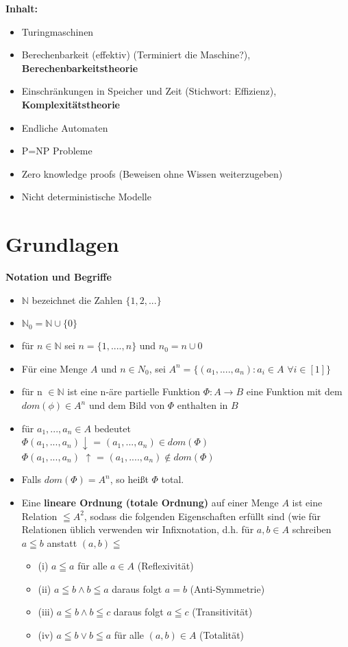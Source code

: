 \textbf{Inhalt:}
\begin{itemize}
    \item Turingmaschinen
    \item Berechenbarkeit (effektiv) (Terminiert die Maschine?), \textbf{Berechenbarkeitstheorie}
    \item Einschränkungen in Speicher und Zeit (Stichwort: Effizienz), \textbf{Komplexitätstheorie}
    \item Endliche Automaten
    \item P=NP Probleme
    \item Zero knowledge proofs (Beweisen ohne Wissen weiterzugeben)
    \item Nicht deterministische Modelle

\end{itemize}

\section{Grundlagen}

\textbf{Notation und Begriffe}
\begin{itemize}
    \item $\mathbb{N}$ bezeichnet die Zahlen $\{1,2,...\}$
    \item $\mathbb{N}_0 =\mathbb{N} \cup \{0\}$
    \item für $n \in \mathbb{N}$ sei $n=\{1,....,n\}$ und $n_0 = n \cup{0}$
    \item Für eine Menge $A$ und $n \in N_0$, sei $A^n = \{(a_1,....,a_n): a_i \in A$ $\forall i \in [1]\}$
    \item für n $\in \mathbb{N}$ ist eine n-äre partielle Funktion $\Phi: A \rightarrow B$ eine Funktion mit dem $dom(\phi) \in A^n$ und dem Bild von $\Phi$ enthalten in $B$
    \item für $a_1,...,a_n \in A$ bedeutet \\
    $\Phi (a_1,...,a_n) \downarrow$ = $(a_1,...,a_n) \in dom (\Phi)$ \\
    $\Phi(a_1,...,a_n)$ $\uparrow$ = $(a_1,....,a_n) \notin dom(\Phi)$

    \item Falls $dom(\Phi)=A^n$, so heißt $\Phi$ total.

    \item Eine \textbf{lineare Ordnung (totale Ordnung)} auf einer Menge $A$ ist eine Relation $\leqq A^2$, sodass die folgenden Eigenschaften erfüllt sind (wie für Relationen üblich verwenden wir Infixnotation, d.h. für $a,b \in A$ schreiben  $a \leqq b$ anstatt $(a,b)\leqq$
    \begin{itemize}
        \item (i) $a \leqq a$ für alle $a \in A$ (Reflexivität) 
        \item (ii) $a \leqq b \land b \leqq a$ daraus folgt $a=b$ (Anti-Symmetrie)
        \item (iii) $a \leqq b \land b \leqq c$ daraus folgt $a \leqq c$ (Transitivität)
        \item (iv) $a \leqq b \lor b \leqq a$ für alle $(a,b)\in A$ (Totalität)
    \end{itemize}
\end{itemize}


